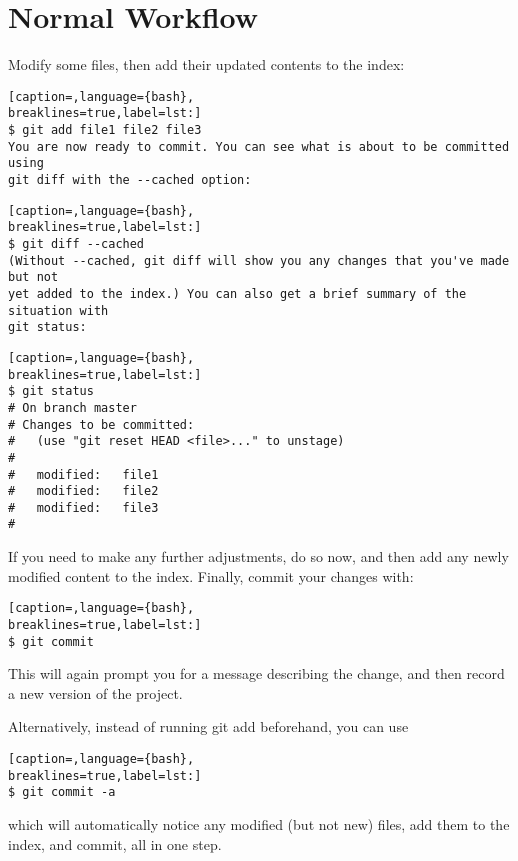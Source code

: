 \section{Normal Workflow}
Modify some files, then add their updated contents to the index:
\lstset{basicstyle=\scriptsize, numbers=none, captionpos=b, tabsize=4}
\begin{lstlisting}[caption=,language={bash},
breaklines=true,label=lst:]
$ git add file1 file2 file3
You are now ready to commit. You can see what is about to be committed using
git diff with the --cached option:
\end{lstlisting}

\lstset{basicstyle=\scriptsize, numbers=none, captionpos=b, tabsize=4}
\begin{lstlisting}[caption=,language={bash},
breaklines=true,label=lst:]
$ git diff --cached
(Without --cached, git diff will show you any changes that you've made but not
yet added to the index.) You can also get a brief summary of the situation with
git status:
\end{lstlisting}

\lstset{basicstyle=\scriptsize, numbers=none, captionpos=b, tabsize=4}
\begin{lstlisting}[caption=,language={bash},
breaklines=true,label=lst:]
$ git status
# On branch master
# Changes to be committed:
#   (use "git reset HEAD <file>..." to unstage)
#
#   modified:   file1
#   modified:   file2
#   modified:   file3
#
\end{lstlisting}

If you need to make any further adjustments, do so now, and then add any newly
modified content to the index. Finally, commit your changes with:
\lstset{basicstyle=\scriptsize, numbers=none, captionpos=b, tabsize=4}
\begin{lstlisting}[caption=,language={bash},
breaklines=true,label=lst:]
$ git commit
\end{lstlisting}

This will again prompt you for a message describing the change, and then record
a new version of the project.

Alternatively, instead of running git add beforehand, you can use
\lstset{basicstyle=\scriptsize, numbers=none, captionpos=b, tabsize=4}
\begin{lstlisting}[caption=,language={bash},
breaklines=true,label=lst:]
$ git commit -a
\end{lstlisting}

which will automatically notice any modified (but not new) files, add them to
the index, and commit, all in one step.

